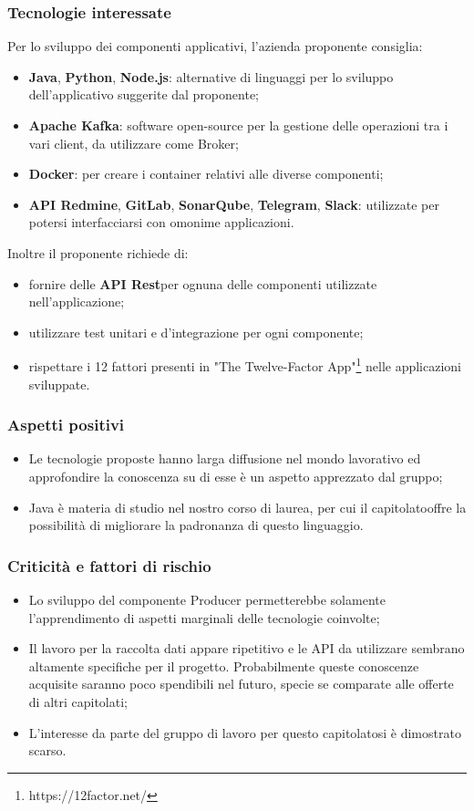 \subsubsection{Tecnologie interessate}
Per lo sviluppo dei componenti applicativi, l'azienda proponente consiglia:
\begin{itemize}
	\item \textbf{Java}, \textbf{Python}\glo, \textbf{Node.js}\glo: alternative di linguaggi per lo sviluppo dell'applicativo suggerite dal proponente; 
	\item\textbf{Apache Kafka}\glo : software open-source per la gestione delle operazioni tra i vari client, da utilizzare come Broker;
	\item \textbf{Docker}\glo: per creare i container relativi alle diverse componenti;
	\item \textbf{API Redmine}\glo,  \textbf{GitLab}\glo,  \textbf{SonarQube}\glo,  \textbf{Telegram}\glo, \textbf{Slack}\glo: utilizzate per potersi interfacciarsi con omonime applicazioni.
\end{itemize}
Inoltre il proponente richiede di:
\begin{itemize}
	\item fornire delle \textbf{API Rest}\glosp per ognuna delle componenti utilizzate nell'applicazione; 
	\item utilizzare test unitari e d'integrazione per ogni componente; 
	\item rispettare i 12 fattori presenti in "The Twelve-Factor App"\footnote{https://12factor.net/} nelle applicazioni sviluppate.
\end{itemize}
\subsubsection{Aspetti positivi}
\begin{itemize}
	\item Le tecnologie proposte hanno larga diffusione nel mondo lavorativo ed
	 approfondire la conoscenza su di esse è un aspetto apprezzato dal gruppo;
	\item Java è materia di studio nel nostro corso di laurea, per cui il
	 capitolato\glosp offre la possibilità di migliorare la padronanza di questo
	 linguaggio.
\end{itemize}

\subsubsection{Criticità e fattori di rischio}
\begin{itemize}
	\item Lo sviluppo del componente Producer permetterebbe solamente l'apprendimento di aspetti marginali delle tecnologie coinvolte;
	\item Il lavoro per la raccolta dati appare ripetitivo 
	 e le API da utilizzare sembrano altamente specifiche per il progetto. Probabilmente queste conoscenze acquisite saranno poco spendibili nel futuro, specie se comparate alle offerte di altri capitolati;
	\item L'interesse da parte del gruppo di lavoro per questo capitolato\glosp si è dimostrato scarso.
\end{itemize}

